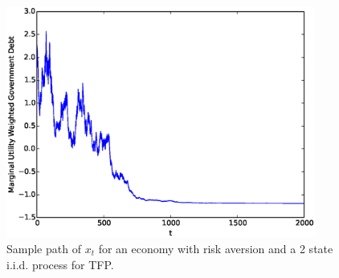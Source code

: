 \documentclass[12pt]{article}
\newcommand{\tjs}[1]{\textcolor{red}{$^{\textrm{tjs}}${#1}}}
\begin{document}
\begin{figure}[ht]
	\begin{center}
	\includegraphics[width=4in]{Images/2stateiid.eps}
\caption{Sample path of $x_t$  for an economy with risk aversion and a 2 state i.i.d. process for TFP.\label{fig:conv_RA}}
	\end{center}
\end{figure}



%
%
%
\end{document}
